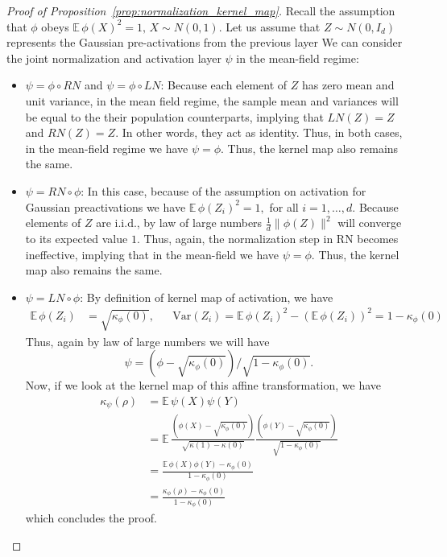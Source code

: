 \documentclass[twoside]{article}
\newcommand{\E}{\mathbb{E}\,}
\theoremstyle{definition}
\begin{document}
\begin{proof}[Proof of Proposition~\ref{prop:normalization_kernel_map}]
Recall the assumption that $\phi$ obeys $\E \phi(X)^2 = 1,\, X\sim N(0,1). $ Let us assume that $Z\sim N(0,I_d)$ represents the Gaussian pre-activations from the previous layer We can consider the joint normalization and activation layer $\psi$ in the mean-field regime: 
\begin{itemize}
    \item $\psi = \phi\circ RN$ and $\psi = \phi\circ LN$: Because each element of $Z$ has zero mean and unit variance, in the mean field regime, the sample mean and variances will be equal to the their population counterparts, implying that $LN(Z) = Z$ and $RN(Z) = Z.$ In other words, they act as identity. Thus, in both cases, in the mean-field regime we have $\psi = \phi.$ Thus, the kernel map also remains the same. 
    \item $\psi = RN \circ \phi$: In this case, because of the assumption on activation for Gaussian preactivations we have $\E \phi(Z_i)^2 = 1,$ for all $i=1,\dots, d.$ Because elements of $Z$ are i.i.d., by law of large numbers $\frac1d\|\phi(Z)\|^2$ will converge to its expected value $1.$ Thus, again, the normalization step in RN becomes ineffective, implying that in the mean-field we have $\psi = \phi.$ Thus, the kernel map also remains the same. 
    \item $\psi = LN \circ \phi$: By definition of kernel map of activation, we have  
     \begin{align*}
         \E \phi(Z_i) &= \sqrt{\kappa_\phi(0)}, 
        && \mathrm{Var}(Z_i) = \E \phi(Z_i)^2 - (\E \phi(Z_i))^2 =  1- \kappa_\phi(0)
     \end{align*}
    Thus, again by law of large numbers we will have 
    $$\psi = (\phi - \sqrt{\kappa_\phi(0)})/\sqrt{1 - \kappa_\phi(0)}.$$ Now, if we look at the kernel map of this affine transformation, we have 
     \begin{align*}
     \kappa_\psi(\rho) &= \E \psi(X)\psi(Y)\\
     &= \E \frac{(\phi(X)-\sqrt{\kappa_\phi(0)} )}{\sqrt{\kappa(1)-\kappa(0)}}\frac{(\phi(Y)-\sqrt{\kappa_\phi(0)} )}{\sqrt{1-\kappa_\phi(0)}}\\
     &= \frac{\E \phi(X)\phi(Y) - \kappa_\phi(0)}{1-\kappa_\phi(0)}\\
     &= \frac{\kappa_\phi(\rho)-\kappa_\phi(0)}{1-\kappa_\phi(0)}
     \end{align*}
    which concludes the proof. 
\end{itemize}


\end{proof}
\end{document}
